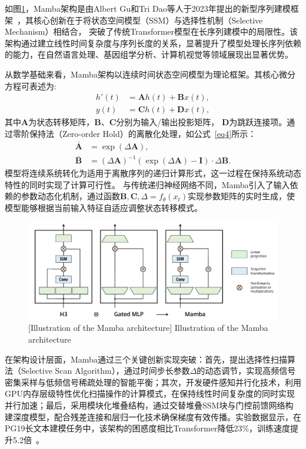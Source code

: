 如图\ref{figure1: Mamba架构示意图}，Mamba架构是由Albert Gu和Tri Dao等人于2023年提出的新型序列建模框架~\cite{gu2023mamba}，其核心创新在于将状态空间模型（SSM）与选择性机制（Selective Mechanism）相结合，
突破了传统Transformer模型在长序列建模中的局限性。该架构通过建立线性时间复杂度与序列长度的关系，显著提升了模型处理长序列依赖的能力，在自然语言处理、基因组学分析、计算机视觉等领域展现出显著优势。

从数学基础来看，Mamba架构以连续时间状态空间模型为理论框架。其核心微分方程可表述为:
\begin{equation}
\begin{aligned}
    h'(t)&=\mathbf{A}h(t)+\mathbf{B}x(t),\\
    y(t)&=\mathbf{C}h(t) +\mathbf{D}x(t),
\end{aligned}
\label{eq3}
\end{equation}
其中$\mathbf{A}$为状态转移矩阵，$\mathbf{B}$、$\mathbf{C}$分别为输入/输出投影矩阵， $\mathbf{D}$为跳跃连接项。通过零阶保持法（Zero-order Hold）的离散化处理，如公式~\ref{eq4}所示：
\begin{equation}
\begin{aligned}
    \mathbf{\bar{A}}&=\exp(\Delta\mathbf{A}),\\
    \mathbf{\bar{B}}&=(\Delta\mathbf{A})^{-1}(\exp(\Delta\mathbf{A})-\mathbf{I})\cdot\Delta\mathbf{B}.
\end{aligned}
\label{eq4}
\end{equation}
模型将连续系统转化为适用于离散序列的递归计算形式，这一过程在保持系统动态特性的同时实现了计算可行性。
与传统递归神经网络不同，Mamba引入了输入依赖的参数动态化机制，通过函数$\mathbf{B},\mathbf{C},\Delta=f_\theta(x_t)$实现参数矩阵的实时生成，使模型能够根据当前输入特征自适应调整状态转移模式。

\begin{figure}[h]
    \centering
    \includegraphics[width=1.0\columnwidth]{figures/RelatedWork/Mamba架构.png}
    [Illustration of the Mamba architecture]{ Illustration of the Mamba architecture~\cite{gu2023mamba}}
    \label{figure1: Mamba架构示意图}
\end{figure}
在架构设计层面，Mamba通过三个关键创新实现突破：首先，提出选择性扫描算法（Selective Scan Algorithm），通过时间步长参数$\Delta$的动态调节，实现高频信号密集采样与低频信号稀疏处理的智能平衡；其次，开发硬件感知并行化技术，利用GPU内存层级特性优化扫描操作的计算模式，在保持线性时间复杂度的同时实现并行加速；最后，采用模块化堆叠结构，通过交替堆叠SSM块与门控前馈网络构建深度模型，配合残差连接和层归一化技术确保梯度有效传播。实验数据显示，在PG19长文本建模任务中，该架构的困惑度相比Transformer降低23\%，训练速度提升5.2倍~\cite{gu2023mamba}。

